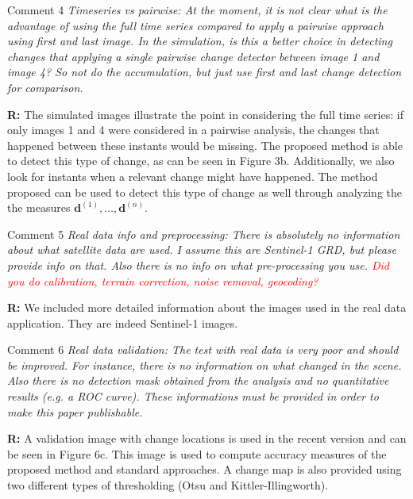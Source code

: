 \documentclass[11pt]{report}
\begin{document}
\medskip
\begin{mybox}{Comment 4}
\textit{Timeseries vs pairwise: At the moment, it is not clear what is the advantage of using the full time series
compared to apply a pairwise approach using first and last image. In the simulation, is this a better choice in
detecting changes that applying a single pairwise change detector between image 1 and image 4? So not do the
accumulation, but just use first and last change detection for comparison.}


\medskip
\textbf{R:} The simulated images illustrate the point in considering the full time series: if only images 1 and 4 were considered in a pairwise analysis, the changes that happened between these instants would be missing. The proposed method is able to detect this type of change, as can be seen in Figure 3b. Additionally, we also look for instants when a relevant change might have happened. The method proposed can be used to detect this type of change as well through analyzing the the measures $\mathbf{d}^{(1)},\ldots,\mathbf{d}^{(n)}$.
\end{mybox}

\medskip
\begin{mybox}{Comment 5}
\textit{Real data info and preprocessing: There is absolutely no information about what satellite data are used. I
assume this are Sentinel-1 GRD, but please provide info on that. Also there is no info on what pre-processing
you use. \textcolor{red}{Did you do calibration, terrain correction, noise removal, geocoding?}}


\medskip
\textbf{R:} We included more detailed information about the images used in the real data application. They are indeed Sentinel-1 images.
\end{mybox}

\medskip
\begin{mybox}{Comment 6}
\textit{Real data validation: The test with real data is very poor and should be improved. For instance, there is
no information on what changed in the scene. Also there is no detection mask obtained from the analysis and
no quantitative results (e.g. a ROC curve). These informations must be provided in order to make this paper
publishable.}


\medskip
\textbf{R:} A validation image with change locations is used in the recent version and can be seen in Figure 6c. This image is used to compute accuracy measures of the proposed method and standard approaches. A change map is also provided using two different types of thresholding (Otsu and Kittler-Illingworth).
\end{mybox}
\end{document}
